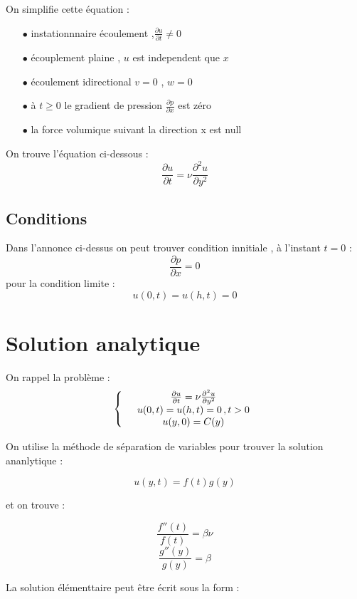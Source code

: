 \documentclass[a4paper,10pt]{report} %
\begin{document}
 
 On simplifie cette équation :
\begin{itemize}
    \item[$\bullet$]instationnnaire écoulement ,$\frac{\partial u}{\partial t}\neq0$
    \item[$\bullet$]écouplement plaine , $u$ est independent que $x$
    \item[$\bullet$]écoulement idirectional  $v=0$ , $w=0$
    \item[$\bullet$]à $t \geq0$ le gradient de pression $\frac{\partial p}{\partial x}$ est zéro
    \item[$\bullet$]la force volumique suivant la direction x est null
\end{itemize}


On trouve l'équation ci-dessous :
\begin{equation}
\frac{\partial u}{\partial t}=\nu\frac{\partial^2u}{\partial y^2}
\end{equation}

\section{Conditions}
Dans l'annonce ci-dessus on peut trouver condition innitiale , à l'instant $t=0$ :
$$\frac{\partial p}{\partial x}=0$$
pour la condition limite :
$$u(0,t)=u(h,t)=0$$


\chapter{Solution analytique}
On rappel la problème :
\begin{equation}
	\left\{
    \begin{array}{r c l }
        &\frac{\partial u}{\partial t}=\nu\frac{\partial^2u}{\partial y^2}\\
        &u(0,t)=u(h,t)=0 \, ,t>0\\
        &u(y,0)=C(y)
    \end{array}
    \right.
\end{equation}


On utilise la méthode de séparation de variables pour trouver la solution ananlytique :

$$u(y,t)=f(t)g(y)$$

et on trouve :

$$\frac{f''(t)}{f(t)}=\beta\nu$$
$$\frac{g''(y)}{g(y)}=\beta$$

La solution élémenttaire peut être écrit sous la form :
\end{document}
